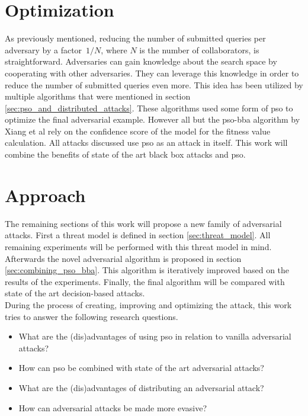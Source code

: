 \section{Optimization} \label{sec:optimization_approach}
As previously mentioned, reducing the number of submitted queries per adversary by a factor~$1/N$, where $N$ is the number of collaborators, is straightforward. Adversaries can gain knowledge about the search space by cooperating with other adversaries. They can leverage this knowledge in order to reduce the number of submitted queries even more. This idea has been utilized by multiple algorithms that were mentioned in section \ref{sec:pso_and_distributed_attacks}. These algorithms used some form of \gls{pso} to optimize the final adversarial example. However all but the \gls{pso}-\gls{bba} algorithm by Xiang et al \cite{distributed_pso_attack} rely on the confidence score of the model for the fitness value calculation. All attacks discussed use \gls{pso} as an attack in itself. This work will combine the benefits of state of the art black box attacks and \gls{pso}.

\section{Approach}\label{sec:approach}
The remaining sections of this work will propose a new family of adversarial attacks. First a threat model is defined in section \ref{sec:threat_model}. All remaining experiments will be performed with this threat model in mind. Afterwards the novel adversarial algorithm is proposed in section \ref{sec:combining_pso_bba}. This algorithm is iteratively improved based on the results of the experiments. Finally, the final algorithm will be compared with state of the art decision-based attacks.\\

During the process of creating, improving and optimizing the attack, this work tries to answer the following research questions. 
\begin{itemize}
	\item What are the (dis)advantages of using \gls{pso} in relation to vanilla adversarial attacks?
	\item How can \gls{pso} be combined with state of the art adversarial attacks?
	\item What are the (dis)advantages of distributing an adversarial attack?
	\item How can adversarial attacks be made more evasive?
\end{itemize} 

